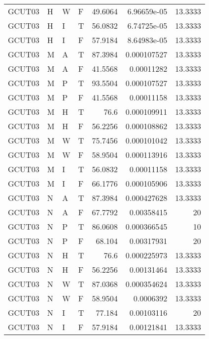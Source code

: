 \begin{table}[htb!]
{\begin{tabular}{llllrrr}
            GCUT03   & H     & W     & F          & 49.6064    & 6.96659e-05 & 13.3333  \\
            GCUT03   & H     & I     & T          & 56.0832    & 6.74725e-05 & 13.3333  \\
            GCUT03   & H     & I     & F          & 57.9184    & 8.64983e-05 & 13.3333  \\
            GCUT03   & M     & A     & T          & 87.3984    & 0.000107527 & 13.3333  \\
            GCUT03   & M     & A     & F          & 41.5568    & 0.00011282  & 13.3333  \\
            GCUT03   & M     & P     & T          & 93.5504    & 0.000107527 & 13.3333  \\
            GCUT03   & M     & P     & F          & 41.5568    & 0.00011158  & 13.3333  \\
            GCUT03   & M     & H     & T          & 76.6       & 0.000109911 & 13.3333  \\
            GCUT03   & M     & H     & F          & 56.2256    & 0.000108862 & 13.3333  \\
            GCUT03   & M     & W     & T          & 75.7456    & 0.000101042 & 13.3333  \\
            GCUT03   & M     & W     & F          & 58.9504    & 0.000113916 & 13.3333  \\
            GCUT03   & M     & I     & T          & 56.0832    & 0.00011158  & 13.3333  \\
            GCUT03   & M     & I     & F          & 66.1776    & 0.000105906 & 13.3333  \\
            GCUT03   & N     & A     & T          & 87.3984    & 0.000427628 & 13.3333  \\
            GCUT03   & N     & A     & F          & 67.7792    & 0.00358415  & 20       \\
            GCUT03   & N     & P     & T          & 86.0608    & 0.000366545 & 10       \\
            GCUT03   & N     & P     & F          & 68.104     & 0.00317931  & 20       \\
            GCUT03   & N     & H     & T          & 76.6       & 0.000225973 & 13.3333  \\
            GCUT03   & N     & H     & F          & 56.2256    & 0.00131464  & 13.3333  \\
            GCUT03   & N     & W     & T          & 87.0368    & 0.000354624 & 13.3333  \\
            GCUT03   & N     & W     & F          & 58.9504    & 0.0006392   & 13.3333  \\
            GCUT03   & N     & I     & T          & 77.184     & 0.00103116  & 20       \\
            GCUT03   & N     & I     & F          & 57.9184    & 0.00121841  & 13.3333  \\
            \hline
        \end{tabular}
    }{
    }
\end{table} 
